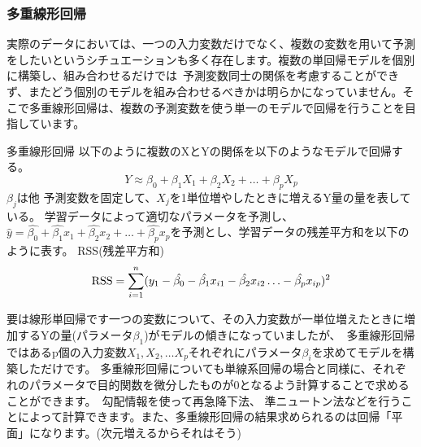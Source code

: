 \documentclass[uplatex]{jsarticle}
\begin{document}
\subsubsection{多重線形回帰}
実際のデータにおいては、一つの入力変数だけでなく、複数の変数を用いて予測をしたいというシチュエーションも多く存在します。複数の単回帰モデルを個別に構築し、組み合わせるだけでは\
予測変数同士の関係を考慮することができず、またどう個別のモデルを組み合わせるべきかは明らかになっていません。そこで多重線形回帰は、複数の予測変数を使う単一のモデルで回帰を行うことを目指しています。
\begin{itembox}[l]{多重線形回帰}
  以下のように複数のXとYの関係を以下のようなモデルで回帰する。
    $$Y \approx \beta_0 + \beta_1X_1 + \beta_2X_2 + \ldots + \beta_pX_p$$
    $\beta_j$は他 予測変数を固定して、$X_j$を1単位増やしたときに増えるY量の量を表している。
    学習データによって適切なパラメータを予測し、$\hat{y} = \hat{\beta_0} + \hat{\beta_1}x_1 + \hat{\beta_2}x_2 + \dots + \hat{\beta_p}x_p$を予測とし、学習データの残差平方和を以下のように表す。
    {\rm RSS}(残差平方和)
    $${\rm RSS} = \sum_{i=1}^n (y_1 - \hat{\beta_0} - \hat{\beta_1}x_{i1} - \hat{\beta_2}x_{i2} \ldots - \hat{\beta_p}x_{ip})^2 $$
\end{itembox}
要は線形単回帰です一つの変数について、その入力変数が一単位増えたときに増加するYの量(パラメータ$\beta_1$)がモデルの傾きになっていましたが、\
多重線形回帰ではあるp個の入力変数$X_1, X_2, \ldots X_p$それぞれにパラメータ$\beta_i$を求めてモデルを構築しただけです。
多重線形回帰についても単線系回帰の場合と同様に、それぞれのパラメータで目的関数を微分したものが0となるよう計算することで求めることができます。\
勾配情報を使って再急降下法、 準ニュートン法などを行うことによって計算できます。また、多重線形回帰の結果求められるのは回帰「平面」になります。(次元増えるからそれはそう)
\end{document}
